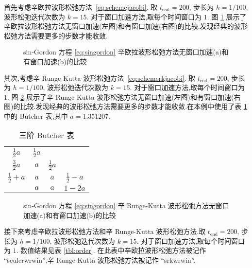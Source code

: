 首先考虑辛欧拉波形松弛方法~\eqref{eq:schemejacobi}. 取 $t_{\text{end}} = 200$, 步长为 $h = 1/100$, 波形松弛迭代次数为 $k=15$. 对于窗口加速方法,取每个时间窗口为 $1$. 图 \ref{fig:ex1seucom} 展示了辛欧拉波形松弛方法无窗口加速(左图)和有窗口加速(右图)的比较.发现经典的波形松弛方法需要更多的步数才能收敛.

\begin{figure}[h!]
  \centering
  \caption{sin-Gordon 方程 \eqref{eq:singordon} 辛欧拉波形松弛方法无窗口加速(a)和有窗口加速(b)的比较}
  \label{fig:ex1seucom}
\end{figure}

其次,考虑辛 Runge-Kutta 波形松弛方法~\eqref{eq:schemerkjacobi}. 取 $t_{\text{end}} = 200$, 步长为 $h = 1/100$, 波形松弛迭代次数为 $k=15$. 对于窗口加速方法,取每个时间窗口为 $1$. 图 \ref{fig:ex1srkcom} 展示了辛 Runge-Kutta 波形松弛方法无窗口加速(左图)和有窗口加速(右图)的比较.发现经典的波形松弛方法需要更多的步数才能收敛.在本例中使用了表 \ref{tbl:rk} 中的 Butcher 表,其中 $a = 1.351207$.

\begin{table}[h!]
  \centering
  \caption{三阶 Butcher 表}
  \label{tbl:rk}
  \begin{tabular}{c|ccc}
    $\frac{1}{2}a$ & $\frac{1}{2}a$ & & \\
    $\frac{3}{2}a$ & $a$ &$\frac{1}{2}a$  & \\
    $\frac{1}{2} + a$ & $a$ & $a$ &$\frac{1}{2}-a$\\
    \hline
    & $a$ &$a$ & $1-2a$\\
  \end{tabular}
\end{table}

\begin{figure}[h!]
  \centering
  \caption{sin-Gordon 方程 \eqref{eq:singordon} 辛 Runge-Kutta 波形松弛方法无窗口加速(a)和有窗口加速(b)的比较}
  \label{fig:ex1srkcom}
\end{figure}

接下来考虑辛欧拉波形松弛方法和辛 Runge-Kutta 波形松弛方法.取 $t_{\text{end}} = 200$, 步长为 $h = 1/100$, 波形松弛迭代次数为 $k=15$. 对于窗口加速方法,取每个时间窗口为 $1$. 数值结果见表 \ref{tbl:order}. 在此表中辛欧拉波形松弛方法被记作 ``seulerwrwin'',辛 Runge-Kutta 波形松弛方法被记作 ``srkwrwin''.

